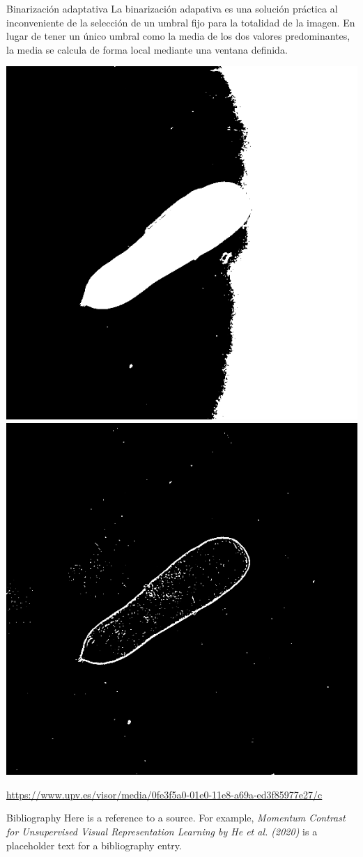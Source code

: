 \documentclass[12pt]{beamer}
\begin{document}
\begin{frame} {Binarización adaptativa}
La binarización adapativa es una solución práctica al inconveniente de la selección de un umbral fijo para la totalidad de la imagen. \newline
En lugar de tener un único umbral como la media de los dos valores predominantes, la media se calcula de forma local mediante una ventana definida.
\begin{table}[cc]
    \centering
    \includegraphics[width=0.3\linewidth]{noadaptive.png}
    \hspace{0.2cm}
    \includegraphics[width=0.3\linewidth]{adaptive.png}
    \label{tab:my_label}
\end{table}
\vspace{0.5cm}  %
\tiny
\url{https://www.upv.es/visor/media/0fe3f5a0-01e0-11e8-a69a-ed3f85977e27/c}
\end{frame}

\begin{frame}
\end{frame}
\begin{frame}[allowframebreaks]{Bibliography}
Here is a reference to a source. For example, \textit{Momentum Contrast for Unsupervised Visual Representation Learning by He et al. (2020)} \cite{he2020momentum} is a placeholder text for a bibliography entry.

\framebreak

\scriptsize


\end{frame}
\end{document}
